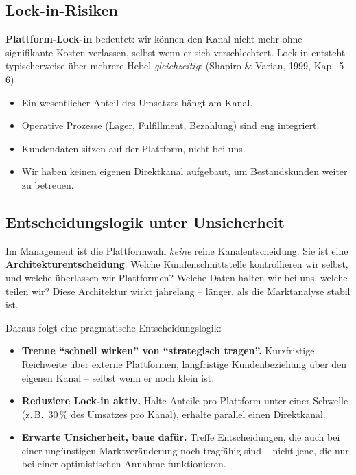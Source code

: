 \documentclass[11pt,a4paper,oneside]{article}
\newcommand{\fachbegriff}[1]{\textbf{#1}}
\newcommand{\quelle}[1]{{\footnotesize\color{lpGray}(#1)}}
\begin{document}
\subsection{Lock-in-Risiken}

\fachbegriff{Plattform-Lock-in} bedeutet: wir können den Kanal nicht mehr ohne signifikante Kosten verlassen, selbst wenn er sich verschlechtert. Lock-in entsteht typischerweise über mehrere Hebel \emph{gleichzeitig}: \quelle{Shapiro \& Varian, 1999, Kap.~5--6}

\begin{itemize}
  \item Ein wesentlicher Anteil des Umsatzes hängt am Kanal.
  \item Operative Prozesse (Lager, Fulfillment, Bezahlung) sind eng integriert.
  \item Kundendaten sitzen auf der Plattform, nicht bei uns.
  \item Wir haben keinen eigenen Direktkanal aufgebaut, um Bestandskunden weiter zu betreuen.
\end{itemize}

\subsection{Entscheidungslogik unter Unsicherheit}

Im Management ist die Plattformwahl \emph{keine} reine Kanalentscheidung. Sie ist eine \fachbegriff{Architekturentscheidung}: Welche Kundenschnittstelle kontrollieren wir selbst, und welche überlassen wir Plattformen? Welche Daten halten wir bei uns, welche teilen wir? Diese Architektur wirkt jahrelang -- länger, als die Marktanalyse stabil ist.

Daraus folgt eine pragmatische Entscheidungslogik:

\begin{itemize}
  \item \textbf{Trenne ``schnell wirken'' von ``strategisch tragen''.} Kurzfristige Reichweite über externe Plattformen, langfristige Kundenbeziehung über den eigenen Kanal -- selbst wenn er noch klein ist.
  \item \textbf{Reduziere Lock-in aktiv.} Halte Anteile pro Plattform unter einer Schwelle (z.\,B.\ 30\,\% des Umsatzes pro Kanal), erhalte parallel einen Direktkanal.
  \item \textbf{Erwarte Unsicherheit, baue dafür.} Treffe Entscheidungen, die auch bei einer ungünstigen Marktveränderung noch tragfähig sind -- nicht jene, die nur bei einer optimistischen Annahme funktionieren.
\end{itemize}
\end{document}
